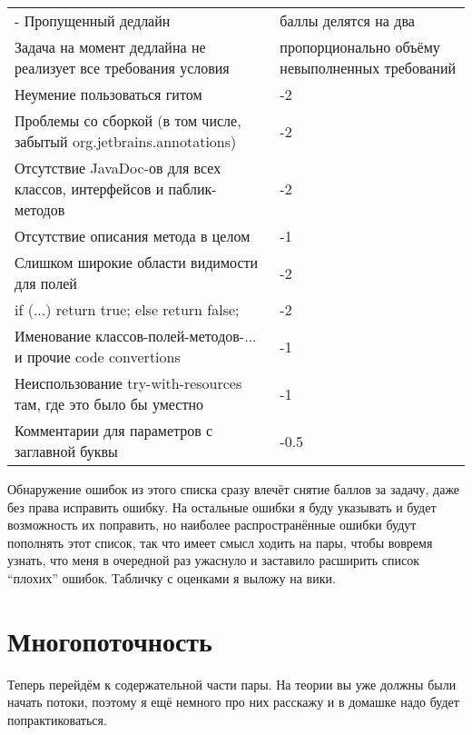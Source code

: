 \documentclass[a5paper]{article}
\begin{document}
\vspace{3mm}
\begin{small}
	\begin{tabu} {| X[1 l p] | X[0.3 l p] |}
		\tabucline-
		\everyrow{\tabucline-}
		Пропущенный дедлайн                                                                   & баллы делятся на два \\
		Задача на момент дедлайна не реализует все требования условия                         & пропорционально объёму невыполненных требований \\
		Неумение пользоваться гитом                                                           & -2 \\
		Проблемы со сборкой (в том числе, забытый org.jetbrains.annotations)                  & -2 \\
		Отсутствие JavaDoc-ов для всех классов, интерфейсов и паблик-методов                  & -2 \\
		Отсутствие описания метода в целом                                                    & -1 \\
		Слишком широкие области видимости для полей                                           & -2 \\
		if (...) return true; else return false;                                              & -2 \\
		Именование классов-полей-методов-... и прочие code convertions                        & -1 \\
		Неиспользование try-with-resources там, где это было бы уместно                       & -1 \\
		Комментарии для параметров с заглавной буквы                                          & -0.5 \\
	\end{tabu}
\end{small}
\vspace{3mm}

Обнаружение ошибок из этого списка сразу влечёт снятие баллов за задачу, даже без права исправить ошибку. На остальные ошибки я буду указывать и будет возможность их поправить, но наиболее распространённые ошибки будут пополнять этот список, так что имеет смысл ходить на пары, чтобы вовремя узнать, что меня в очередной раз ужаснуло и заставило расширить список ``плохих'' ошибок. Табличку с оценками я выложу на вики.

\section{Многопоточность}

Теперь перейдём к содержательной части пары. На теории вы уже должны были начать потоки, поэтому я ещё немного про них расскажу и в домашке надо будет попрактиковаться.
\end{document}
